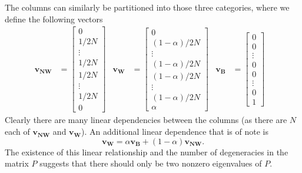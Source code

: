 \documentclass[11pt]{article}
\begin{document}
The columns can similarly be partitioned into those three categories, where we define the following vectors
\begin{align}
\mathbf{v_{NW}}& = \left[\begin{array}{c}
0 \\ 1/2N \\ \vdots \\ 1/2N \\ 1/2N \\ \vdots \\ 1/2N \\ 0
\end{array}\right] & 
\mathbf{v_W}& = \left[\begin{array}{c}
0 \\ (1-\alpha)/2N \\ \vdots \\ (1-\alpha)/2N \\ (1-\alpha)/2N \\ \vdots \\ (1-\alpha)/2N \\ \alpha
\end{array}\right] & 
\mathbf{v_B}& = \left[\begin{array}{c}
0 \\ 0 \\ \vdots \\ 0 \\ 0 \\ \vdots \\ 0 \\ 1
\end{array}\right] & 
\end{align}
Clearly there are many linear dependencies between the columns (as there are $N$ each of $\mathbf{v_{NW}}$ and $\mathbf{v_W}$). An additional linear dependence that is of note is
\begin{equation}
\mathbf{v_W} = \alpha\mathbf{v_B} + (1-\alpha)\mathbf{v_{NW}}.
\end{equation}
The existence of this linear relationship and the number of degeneracies in the matrix $P$ suggests that there should only be two nonzero eigenvalues of $P$.
\end{document}
